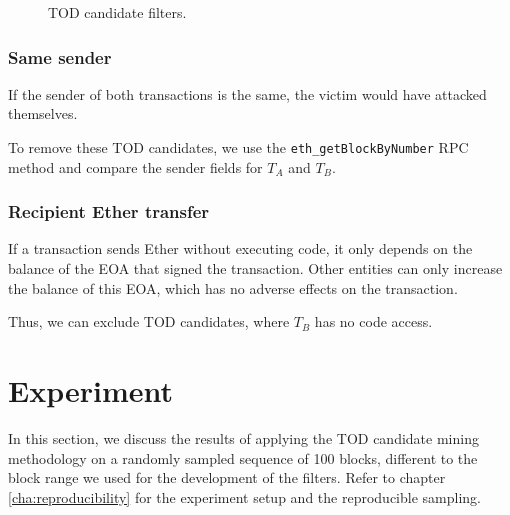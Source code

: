 \documentclass[draft,final]{vutinfth} %
\begin{document}
\begin{figure}[h]
    \centering
    \caption{TOD candidate filters.}
    \label{fig:tod_candidate_dependency}
\end{figure}

\subsubsection{Same sender}

If the sender of both transactions is the same, the victim would have attacked themselves.

To remove these TOD candidates, we use the \verb|eth_getBlockByNumber| RPC method and compare the sender fields for $T_A$ and $T_B$.

\subsubsection{Recipient Ether transfer}

If a transaction sends Ether without executing code, it only depends on the balance of the EOA that signed the transaction. Other entities can only increase the balance of this EOA, which has no adverse effects on the transaction.

Thus, we can exclude TOD candidates, where $T_B$ has no code access.

\section{Experiment}

In this section, we discuss the results of applying the TOD candidate mining methodology on a randomly sampled sequence of 100 blocks, different to the block range we used for the development of the filters. Refer to chapter \ref{cha:reproducibility} for the experiment setup and the reproducible sampling.
\end{document}
